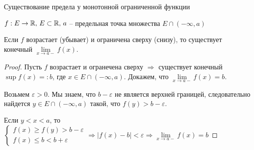 \vspace{7mm}

\begin{theorem-non}
    Существование предела у монотонной ограниченной функции

    $f : E \to \mathbb{R}, \, E \subset \mathbb{R}, \, a$ -- предельная точка множества $E \cap (-\infty, a)$

    Если $f$ возрастает (убывает) и ограничена сверху (снизу), то существует конечный $\lim\limits_{x \to a-} f(x)$.
\end{theorem-non}
\begin{proof}
    Пусть $f$ возрастает и огранечена сверху $\Rightarrow$ существует конечный $\sup f(x) =: b$, где $x \in E \cap (-\infty, a)$.
    Докажем, что $\lim\limits_{x \to a-} f(x) = b$.

    Возьмем $\varepsilon > 0$. Мы знаем, что $b - \varepsilon$ не является верхней границей, следовательно найдется $y \in E \cap (-\infty, a)$ такой, что $f(y) > b - \varepsilon$.


    Если $y < x < a$, то $\begin{cases} f(x) \geqslant f(y) > b - \varepsilon \\ f(x) \leqslant b < b + \varepsilon \end{cases} \Rightarrow |f(x) - b| < \varepsilon \Rightarrow \lim\limits_{x \to a-} f(x) = b$
\end{proof}